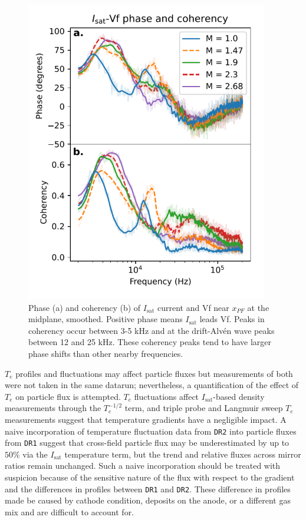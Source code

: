 \begin{figure}
    \centering
    \includegraphics[width=300pt]{figures/fig9.pdf}
    \caption{Phase (a) and coherency (b) of $I_\text{sat}$ current and Vf near $x_{PF}$ at the midplane, smoothed. Positive phase means $I_\text{sat}$ leads Vf. Peaks in coherency occur between 3-5 kHz and at the drift-Alv\'en wave peaks between 12 and 25 kHz. These coherency peaks tend to have larger phase shifts than other nearby frequencies. }
    \label{fig:isat-Vf_phase}
\end{figure}

$T_e$ profiles and fluctuations may affect particle fluxes but measurements of both were not taken in the same datarun; nevertheless, a quantification of the effect of $T_e$ on particle flux is attempted.
$T_e$ fluctuations affect $I_\text{sat}$-based density measurements through the $T_e^{-1/2}$ term, and triple probe and Langmuir sweep $T_e$ measurements suggest that temperature gradients have a negligible impact. A naive incorporation of temperature fluctuation data from \texttt{DR2} into particle fluxes from \texttt{DR1} suggest that cross-field particle flux may be underestimated by up to $50\%$ via the $I_\text{sat}$ temperature term, but the trend and relative fluxes across mirror ratios remain unchanged. Such a naive incorporation should be treated with suspicion because of the sensitive nature of the flux with respect to the gradient and the differences in profiles between \texttt{DR1} and \texttt{DR2}. These difference in profiles made be caused by cathode condition, deposits on the anode, or a different gas mix and are difficult to account for.

